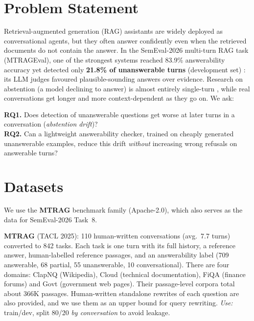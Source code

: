 \documentclass[10pt,twocolumn]{article}
\begin{document}

\section{Problem Statement}
Retrieval-augmented generation (RAG) assistants are widely deployed as conversational agents, but they often answer confidently even when the retrieved documents do not contain the answer. In the SemEval-2026 multi-turn RAG task (MTRAGEval), one of the strongest systems reached 83.9\% answerability accuracy yet detected only \textbf{21.8\% of unanswerable turns} (development set) \cite{ails}: its LLM judges favoured plausible-sounding answers over evidence. Research on abstention (a model declining to answer) is almost entirely single-turn \cite{wen2025,feng}, while real conversations get longer and more context-dependent as they go on. We ask:

\textbf{RQ1.} Does detection of unanswerable questions get worse at later turns in a conversation (\emph{abstention drift})?\\
\textbf{RQ2.} Can a lightweight answerability checker, trained on cheaply generated unanswerable examples, reduce this drift \emph{without} increasing wrong refusals on answerable turns?

\section{Datasets}
We use the \textbf{MTRAG} benchmark family (Apache-2.0), which also serves as the data for SemEval-2026 Task~8.

\textbf{MTRAG} \cite{mtrag} (TACL 2025): 110 human-written conversations (avg.\ 7.7 turns) converted to 842 tasks. Each task is one turn with its full history, a reference answer, human-labelled reference passages, and an answerability label (709 answerable, 68 partial, 55 unanswerable, 10 conversational). There are four domains: ClapNQ (Wikipedia), Cloud (technical documentation), FiQA (finance forums) and Govt (government web pages). Their passage-level corpora total about 366K passages. Human-written standalone rewrites of each question are also provided, and we use them as an upper bound for query rewriting. \emph{Use:} train/dev, split 80/20 \emph{by conversation} to avoid leakage.
\end{document}
